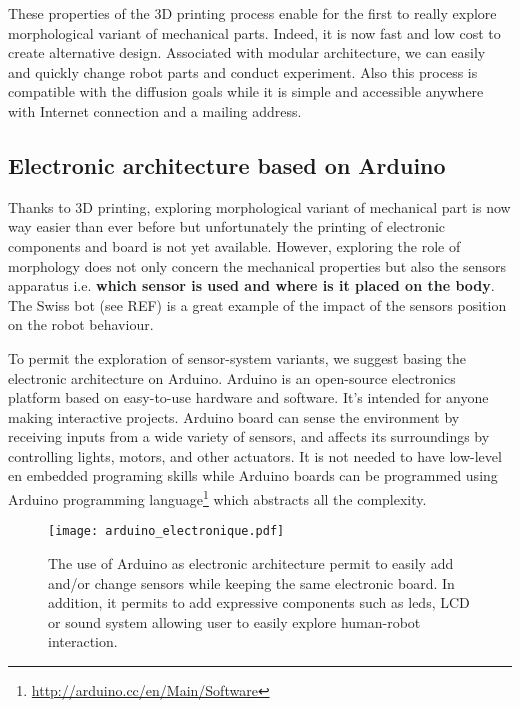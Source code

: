 These properties of the 3D printing process enable for the first to really explore morphological variant of mechanical parts. Indeed, it is now fast and low cost to create alternative design. Associated with modular architecture, we can easily and quickly change robot parts and conduct experiment. Also this process is compatible with the diffusion goals while it is simple and accessible anywhere with Internet connection and a mailing address.


\subsection{Electronic architecture based on Arduino} %

Thanks to 3D printing, exploring morphological variant of mechanical part is now way easier than ever before but unfortunately the printing of electronic components and board is not yet available. However, exploring the role of morphology does not only concern the mechanical properties but also the sensors apparatus i.e. \textbf{which sensor is used and where is it placed on the body}. The Swiss bot (see REF) is a great example of the impact of the sensors position on the robot behaviour.

To permit the exploration of sensor-system variants, we suggest basing the electronic architecture on Arduino. Arduino is an open-source electronics platform based on easy-to-use hardware and software. It's intended for anyone making interactive projects. Arduino board can sense the environment by receiving inputs from a wide variety of sensors, and affects its surroundings by controlling lights, motors, and other actuators. It is not needed to have low-level en embedded programing skills while Arduino boards can be programmed using Arduino programming language\footnote{\url{http://arduino.cc/en/Main/Software}} which abstracts all the complexity.

\begin{figure}[]
    \begin{center}
        \texttt{[image: arduino\_electronique.pdf]}
    \end{center}
    \caption{The use of Arduino as electronic architecture permit to easily add and/or change sensors while keeping the same electronic board. In addition, it permits to add expressive components such as leds, LCD or sound system allowing user to easily explore human-robot interaction.}
    \label{fig:arduino_modular_electronic}
\end{figure}


